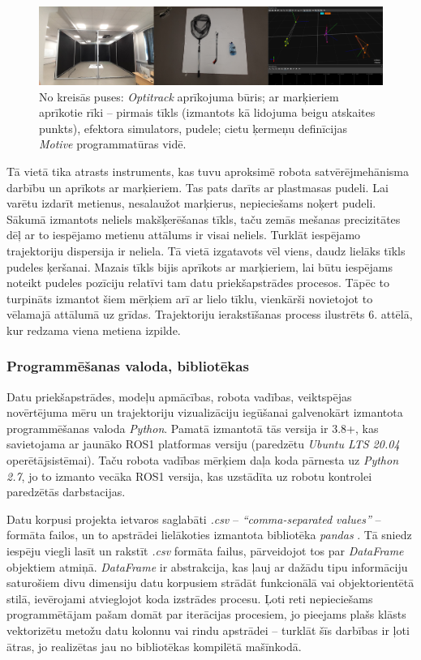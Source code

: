 \documentclass[12pt, a4paper]{article}
\numberwithin{equation}{section} %
\begin{document}
\begin{figure}[t!]
    \centering
    \includegraphics[width=16cm,page=1]{../img/mocap_equipment.jpg}
    \caption{No kreisās puses: \textit{Optitrack} aprīkojuma būris; ar marķieriem aprīkotie rīki -- pirmais tīkls (izmantots kā lidojuma beigu atskaites punkts), efektora simulators, pudele; cietu ķermeņu definīcijas \textit{Motive} programmatūras vidē.}
\end{figure}

Tā vietā tika atrasts instruments, kas tuvu aproksimē robota satvērējmehānisma darbību un aprīkots ar marķieriem. Tas pats darīts ar plastmasas pudeli. Lai varētu izdarīt metienus, nesalaužot marķierus, nepieciešams noķert pudeli. Sākumā izmantots neliels makšķerēšanas tīkls, taču zemās mešanas precizitātes dēļ ar to iespējamo metienu attālums ir visai neliels. Turklāt iespējamo trajektoriju dispersija ir neliela. Tā vietā izgatavots vēl viens, daudz lielāks tīkls pudeles ķeršanai. Mazais tīkls bijis aprīkots ar marķieriem, lai būtu iespējams noteikt pudeles pozīciju relatīvi tam datu priekšapstrādes procesos. Tāpēc to turpināts izmantot šiem mērķiem arī ar lielo tīklu, vienkārši novietojot to vēlamajā attālumā uz grīdas. Trajektoriju ierakstīšanas process ilustrēts 6. attēlā, kur redzama viena metiena izpilde.

\subsubsection{Programmēšanas valoda, bibliotēkas}

Datu priekšapstrādes, modeļu apmācības, robota vadības, veiktspējas novērtējuma mēru un trajektoriju vizualizāciju iegūšanai galvenokārt izmantota programmēšanas valoda \textit{Python}. Pamatā izmantotā tās versija ir 3.8+, kas savietojama ar jaunāko ROS1 platformas versiju (paredzētu \textit{Ubuntu LTS 20.04} operētājsistēmai). Taču robota vadības mērķiem daļa koda pārnesta uz \textit{Python 2.7}, jo to izmanto vecāka ROS1 versija, kas uzstādīta uz robotu kontrolei paredzētās darbstacijas.

Datu korpusi projekta ietvaros saglabāti \textit{.csv} -- \textit{``comma-separated values''} -- formāta failos, un to apstrādei lielākoties izmantota bibliotēka \textit{pandas} \cite{pandas_docs}. Tā sniedz iespēju viegli lasīt un rakstīt \textit{.csv} formāta failus, pārveidojot tos par \textit{DataFrame} objektiem atmiņā. \textit{DataFrame} ir abstrakcija, kas ļauj ar dažādu tipu informāciju saturošiem divu dimensiju datu korpusiem strādāt funkcionālā vai objektorientētā stilā, ievērojami atvieglojot koda izstrādes procesu. Ļoti reti nepieciešams programmētājam pašam domāt par iterācijas procesiem, jo pieejams plašs klāsts vektorizētu metožu datu kolonnu vai rindu apstrādei -- turklāt šīs darbības ir ļoti ātras, jo realizētas jau no bibliotēkas kompilētā mašīnkodā. 
\end{document}
